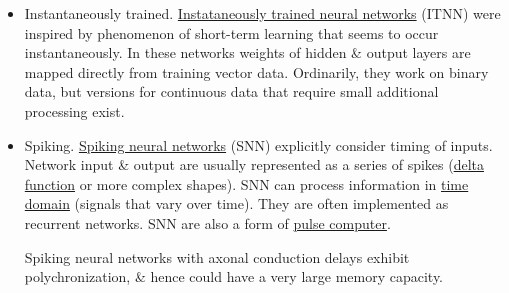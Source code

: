 \documentclass{article}
\begin{document}
\begin{itemize}
	\item {\sf Instantaneously trained.} \href{https://en.wikipedia.org/wiki/Instantaneously_trained_neural_networks}{Instataneously trained neural networks} (ITNN) were inspired by phenomenon of short-term learning that seems to occur instantaneously. In these networks weights of hidden \& output layers are mapped directly from training vector data. Ordinarily, they work on binary data, but versions for continuous data that require small additional processing exist.
	\item {\sf Spiking.} \href{https://en.wikipedia.org/wiki/Spiking_neural_network}{Spiking neural networks} (SNN) explicitly consider timing of inputs. Network input \& output are usually represented as a series of spikes (\href{https://en.wikipedia.org/wiki/Delta_function}{delta function} or more complex shapes). SNN can process information in \href{https://en.wikipedia.org/wiki/Time_domain}{time domain} (signals that vary over time). They are often implemented as recurrent networks. SNN are also a form of \href{https://en.wikipedia.org/wiki/Pulse_computer}{pulse computer}.
	
	Spiking neural networks with axonal conduction delays exhibit polychronization, \& hence could have a very large memory capacity.
	

\end{itemize}
\end{document}
